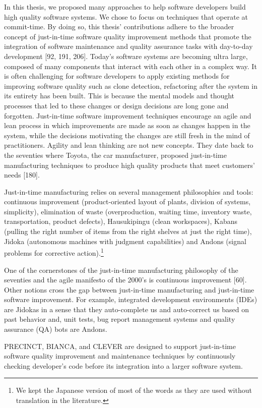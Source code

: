 \documentclass[12pt]{report}
\begin{document}
In this thesis, we proposed many approaches to help software developers
build high quality software systems. We chose to focus on techniques
that operate at commit-time. By doing so, this thesis' contributions
adhere to the broader concept of just-in-time software quality
improvement methods that promote the integration of software maintenance
and quality assurance tasks with day-to-day development {[}92, 191,
206{]}. Today's software systems are becoming ultra large, composed of
many components that interact with each other in a complex way. It is
often challenging for software developers to apply existing methods for
improving software quality such as clone detection, refactoring after
the system in its entirety has been built. This is because the mental
models and thought processes that led to these changes or design
decisions are long gone and forgotten. Just-in-time software improvement
techniques encourage an agile and lean process in which improvements are
made as soon as changes happen in the system, while the decisions
motivating the changes are still fresh in the mind of practitioners.
Agility and lean thinking are not new concepts. They date back to the
seventies where Toyota, the car manufacturer, proposed just-in-time
manufacturing techniques to produce high quality products that meet
customers' needs {[}180{]}.

Just-in-time manufacturing relies on several management philosophies and
tools: continuous improvement (product-oriented layout of plants,
division of systems, simplicity), elimination of waste (overproduction,
waiting time, inventory waste, transportation, product defects),
Hausukipingu (clean workspaces), Kabans (pulling the right number of
items from the right shelves at just the right time), Jidoka (autonomous
machines with judgment capabilities) and Andons (signal problems for
corrective action).\footnote{We kept the Japanese version of most of the
  words as they are used without translation in the literature.}

One of the cornerstones of the just-in-time manufacturing philosophy of
the seventies and the agile manifesto of the 2000's is continuous
improvement {[}60{]}. Other notions cross the gap between just-in-time
manufacturing and just-in-time software improvement. For example,
integrated development environments (IDEs) are Jidokas in a sense that
they auto-complete us and auto-correct us based on past behavior and,
unit tests, bug report management systems and quality assurance (QA)
bots are Andons.

PRECINCT, BIANCA, and CLEVER are designed to support just-in-time
software quality improvement and maintenance techniques by continuously
checking developer's code before its integration into a larger software
system.
\end{document}
